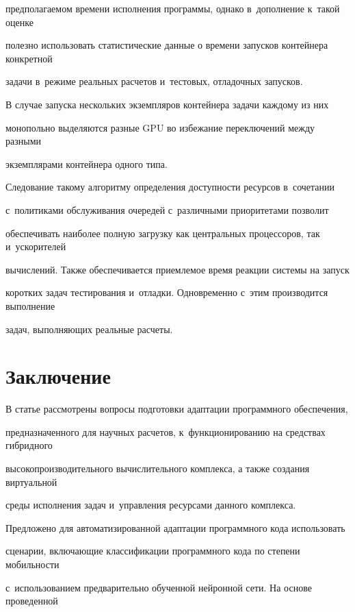 предполагаемом времени исполнения программы, однако в~дополнение к~такой оценке 

полезно использовать статистические данные о времени запусков контейнера конкретной 

задачи в~режиме реальных расчетов и~тестовых, отладочных запусков.

      

      В случае запуска нескольких экземпляров контейнера задачи каждому из них 

монопольно выделяются разные GPU во избежание переключений между разными 

экземплярами контейнера одного типа.

      

      Следование такому алгоритму определения доступности ресурсов в~сочетании 

с~политиками обслуживания очередей с~различными приоритетами позволит 

обеспечивать наиболее полную загрузку как центральных процессоров, так и~ускорителей 

вычислений. Также обеспечивается приемлемое время реакции системы на запуск 

коротких задач тестирования и~отладки. Одновременно с~этим производится выполнение 

задач, выполняющих реальные расчеты.

      

\section{Заключение}



      В статье рассмотрены вопросы подготовки адаптации программного обеспечения, 

предназначенного для научных расчетов, к~функционированию на средствах гибридного 

высокопроизводительного вычислительного комплекса, а также создания виртуальной 

среды исполнения задач и~управления ресурсами данного комплекса.

    

      Предложено для автоматизированной адаптации программного кода использовать 

сценарии, включающие классификации программного кода по степени мобильности 

с~использованием предварительно обученной нейронной сети. На основе проведенной 


